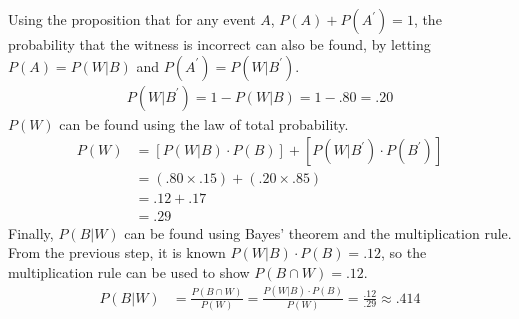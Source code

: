 \documentclass[letterpaper,12pt]{article}
\begin{document}
\begin{enumerate}
    \\ \\
    Using the proposition that for any event $A$, $P(A) + P(A^\prime) = 1$, the probability that the witness is incorrect can also be found, by letting $P(A) = P(W|B)$ and $P(A^\prime) = P(W|B^\prime)$.
    \begin{align*}
      P(W|B^\prime) = 1 - P(W|B) = 1 - .80 = .20
    \end{align*}
    $P(W)$ can be found using the law of total probability.
    \begin{align*}
      P(W) &= [P(W|B) \cdot P(B)] + [P(W|B^\prime) \cdot P(B^\prime)] \\
      &= (.80 \times .15) + (.20 \times .85) \\
      &= .12 + .17 \\
      &= .29
    \end{align*}
    Finally, $P(B|W)$ can be found using Bayes' theorem and the multiplication rule. From the previous step, it is known $P(W|B) \cdot P(B) = .12$, so the multiplication rule can be used to show $P(B \cap W) = .12$.
    \begin{align*}
      P(B|W) &= \frac{P(B \cap W)}{P(W)} = \frac{P(W|B) \cdot P(B)}{P(W)} = \frac{.12}{.29} \approx .414
    \end{align*}
\end{enumerate}
\end{document}
